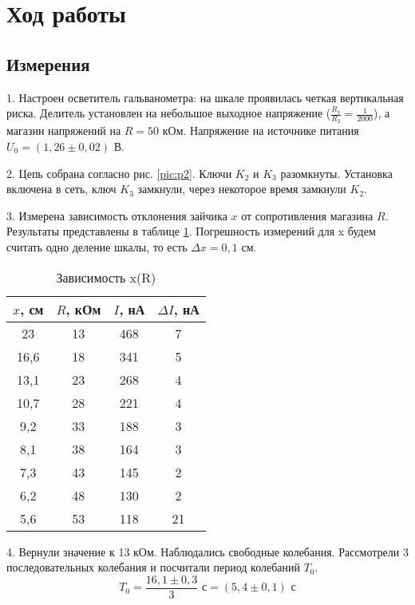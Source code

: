 \section{Ход работы}
\subsection{Измерения}

1. Настроен осветитель гальванометра: на шкале проявилась четкая вертикальная риска. Делитель установлен на небольшое выходное напряжение ($\frac{R_1}{R_2} = \frac{1}{2000}$), а магазин напряжений на $R = 50$ кОм. Напряжение на источнике питания $U_0 = (1,26 \pm 0,02)$ В.

2. Цепь собрана согласно рис. \ref{pic:p2}. Ключи $K_2$ и $K_3$ разомкнуты. Установка включена в сеть, ключ $K_3$ замкнули, через некоторое время замкнули $K_2$.

3. Измерена зависимость отклонения зайчика $x$ от сопротивления магазина $R$. Результаты представлены в таблице \ref{tab:x(R)}. Погрешность измерений для x будем считать одно деление шкалы, то есть $\Delta x = 0,1$ см.

\begin{table}[h]
    \centering
    \begin{tabular}{|c|c|c|c|}
        \hline
        $x$, см & $R$, кОм & $I$, нА & $\Delta I$, нА\\
        \hline
        23 & 13 & 468 & 7\\
        \hline
        16,6 & 18 & 341 & 5\\
        \hline
        13,1 & 23 & 268 & 4\\
        \hline
        10,7 & 28 & 221 & 4\\
        \hline
        9,2 & 33 & 188 & 3\\
        \hline
        8,1 & 38 & 164 & 3\\
        \hline
        7,3 & 43 & 145 & 2\\
        \hline
        6,2 & 48 & 130 & 2\\
        \hline
        5,6 & 53 & 118 & 21\\
        \hline
    \end{tabular}
    \caption{Зависимость x(R)}
    \label{tab:x(R)}
\end{table}

4. Вернули значение к 13 кОм. Наблюдались свободные колебания. Рассмотрели 3 последовательных колебания и посчитали период колебаний $T_0$.
\[T_0 = \frac{16,1 \pm 0,3}{3} \text{ с}= (5,4 \pm 0,1) \text{ с}\]

